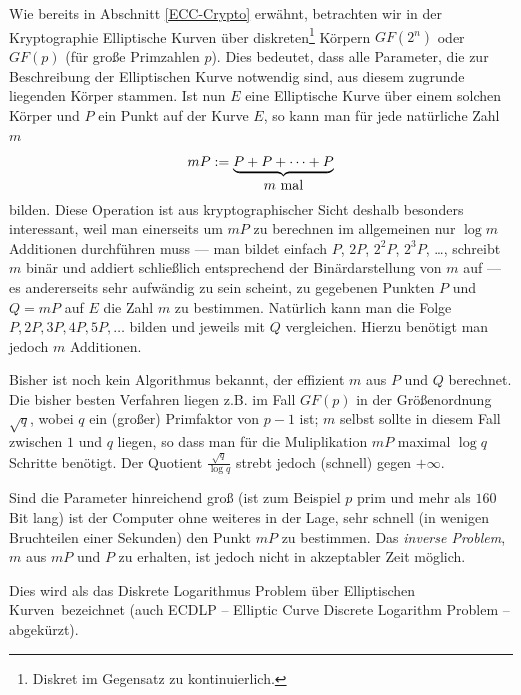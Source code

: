 \begin{refsegment}
Wie bereits in Abschnitt \ref{ECC-Crypto} erwähnt, betrachten wir in der Kryptographie Elliptische Kurven über diskreten\footnote{Diskret im Gegensatz zu kontinuierlich.} Körpern $GF(2^n)$ oder $GF(p)$ (für große Primzahlen $p$). Dies bedeutet, dass alle Parameter, die zur Beschreibung der Elliptischen Kurve notwendig sind, aus diesem zugrunde liegenden Körper stammen. Ist nun $E$ eine Elliptische Kurve über einem solchen Körper und $P$ ein Punkt auf der Kurve $E$, so kann man für jede natürliche Zahl $m$
$$ mP := \underbrace{P+P+\dots+P}_{\hbox{$m$ mal}}
$$
bilden. Diese Operation ist aus kryptographischer Sicht deshalb besonders interessant, weil man einerseits um $mP$ zu berechnen im allgemeinen nur $\log m$ Additionen durchführen muss --- man bildet einfach $P$, $2P$, $2^2P$, $2^3P$, \dots, schreibt $m$ binär und addiert schließlich entsprechend der Binärdarstellung von $m$ auf --- es andererseits sehr
aufwändig zu sein scheint, zu gegebenen Punkten $P$ und $Q=mP$ auf $E$ die Zahl $m$ zu bestimmen. Natürlich kann man die Folge $P,2P,3P,4P,5P,\dots$ bilden und jeweils mit $Q$ vergleichen. Hierzu benötigt man jedoch $m$ Additionen.

Bisher ist noch kein Algorithmus bekannt, der effizient $m$ aus $P$ und $Q$ berechnet. Die bisher besten Verfahren liegen z.B. im Fall $GF(p)$ in der Größenordnung $\sqrt{q}$, wobei $q$ ein (großer) Primfaktor von $p-1$ ist; $m$ selbst sollte in diesem Fall zwischen $1$ und $q$ liegen, so dass man für die Muliplikation $mP$ maximal $\log q$ Schritte benötigt. Der Quotient $\frac{\sqrt{q}}{\log q}$ strebt jedoch (schnell) gegen $+\infty$.

Sind die Parameter hinreichend groß (ist zum Beispiel $p$ prim und
mehr als $160$ Bit lang) ist der Computer ohne weiteres in der Lage, sehr schnell (in wenigen
Bruchteilen einer Sekunden) den Punkt $mP$ zu bestimmen. Das {\it inverse Problem}, $m$ aus $mP$ und $P$ zu erhalten, ist jedoch nicht in akzeptabler Zeit möglich.

Dies wird als das \glqq Diskrete Logarithmus Problem über Elliptischen
Kurven\grqq\ bezeichnet (auch ECDLP -- Elliptic Curve Discrete
Logarithm Problem -- abgekürzt).



\end{refsegment}
